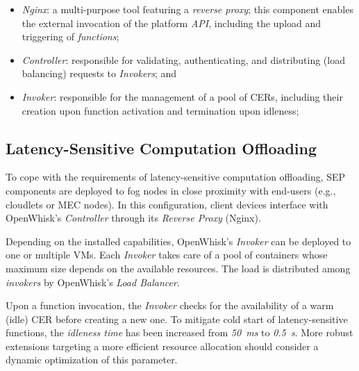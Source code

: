 \begin{itemize}

    \item \textit{Nginx}: a multi-purpose tool featuring a \textit{reverse proxy}; this component enables the external invocation of the platform \textit{API}, including the upload and triggering of \textit{functions};
    
    \item \textit{Controller}: responsible for validating, authenticating, and distributing (load balancing) requests to \textit{Invokers}; and 
    
    \item \textit{Invoker}: responsible for the management of a pool of CERs, including their creation upon function activation and termination upon idleness;
    
    
    
\end{itemize}

\subsection{Latency-Sensitive Computation Offloading}

To cope with the requirements of latency-sensitive computation offloading, SEP components are deployed to fog nodes in close proximity with end-users
(e.g., cloudlets or MEC nodes). In this configuration, client devices interface with  OpenWhisk's \textit{Controller} through its \textit{Reverse Proxy} (Nginx).



Depending on the installed capabilities, OpenWhisk's \textit{Invoker} can be deployed to one or multiple VMs. Each \textit{Invoker} takes care of a pool of containers whose maximum size depends on the available resources. The load is distributed among \textit{invokers} by OpenWhisk's \textit{Load Balancer}.

Upon a function invocation, the \textit{Invoker} checks for the availability of a warm (idle) CER before creating a new one. To mitigate cold start of latency-sensitive functions, the \textit{idleness time} has been increased from \textit{50~ms} to \textit{0.5~s}. More robust extensions targeting a more efficient resource allocation should consider a dynamic optimization of this parameter.

